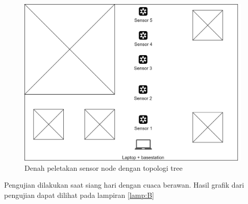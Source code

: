 \begin{figure}[H] 
	\centering  
	\includegraphics[scale=0.3]{Gambar/Hasil Sensing/Pengujian-Tree Paskal 23.jpg} 
	\caption[Denah peletakan sensor node dengan topologi tree]{Denah peletakan sensor node dengan topologi tree}
	\label{fig:denah_tree_paskal} 
\end{figure}

Pengujian dilakukan saat siang hari dengan cuaca berawan. Hasil grafik dari pengujian dapat dilihat pada lampiran \ref{lamp:B}


